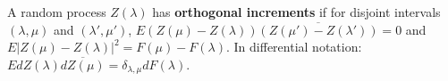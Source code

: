 A random process $Z(\lambda)$ has \textbf{orthogonal increments} if for disjoint intervals $(\lambda,\mu)$ and $(\lambda',\mu')$, $E(Z(\mu)-Z(\lambda))\overline{(Z(\mu')-Z(\lambda'))} = 0$ and $E|Z(\mu)-Z(\lambda)|^2 = F(\mu)-F(\lambda)$. In differential notation: $E dZ(\lambda) \overline{dZ(\mu)} = \delta_{\lambda,\mu} dF(\lambda)$.
